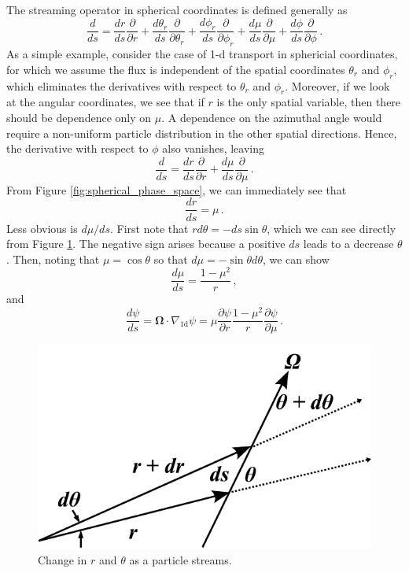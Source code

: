 The streaming operator in spherical coordinates is defined generally as 
\begin{equation}
 \frac{d}{ds} = \frac{dr}{ds}\frac{\partial}{\partial r} + \frac{d\theta_r}{ds}\frac{\partial}{\partial \theta_r} + \frac{d\phi_r}{ds}\frac{\partial}{\partial \phi_r} + \frac{d\mu}{ds}\frac{\partial}{\partial \mu} + \frac{d\phi}{ds}\frac{\partial}{\partial \phi} \, .
\end{equation}
As a simple example, consider the case of 1-d transport in sphericial coordinates, for which we assume the flux is independent of the spatial coordinates $\theta_{r}$ and $\phi_{r}$, which eliminates the derivatives with respect to $\theta_r$ and $\phi_r$.  Moreover, if we look at the angular coordinates, we see that if $r$ is the only spatial variable, then there should be dependence only on $\mu$.  A dependence on the azimuthal angle would require a non-uniform particle distribution in the other spatial directions.  Hence, the derivative with respect to $\phi$ also vanishes, leaving
\begin{equation}
 \frac{d}{ds} = \frac{dr}{ds}\frac{\partial}{\partial r} + \frac{d\mu}{ds}\frac{\partial}{\partial \mu}  \, .
\end{equation}
From Figure \ref{fig:spherical_phase_space}, we can immediately see that
\begin{equation}
 \frac{dr}{ds} = \mu \, .
 \label{eq:drds}
\end{equation}
Less obvious is $d\mu/ds$.  First note that $r d\theta = -ds \sin\theta$, which we can see directly from Figure \ref{fig:spherical_angle_with_r}.  The negative sign arises because a positive $ds$ leads to a decrease $\theta$. Then, noting that $\mu = \cos{\theta}$ so that $d\mu = -\sin{\theta} d\theta$, we can show
\begin{equation}
 \frac{d\mu}{ds} = \frac{1-\mu^2}{r} \, ,
 \label{eq:dmuds}
\end{equation}
and
\begin{equation}
 \frac{d\psi}{ds} = \mathbf{\Omega} \cdot \nabla_{\text{1d}} \psi = \mu \frac{\partial \psi}{\partial r} \frac{1-\mu^2}{r}\frac{\partial \psi}{\partial \mu} \, .
\end{equation}


\begin{figure}[ht] 
    \centering
    \includegraphics[keepaspectratio, width = 2.5 in]{images/spherical_angle_with_r}
    \caption{Change in $r$ and $\theta$ as a particle streams.}
    \label{fig:spherical_angle_with_r}
\end{figure}



